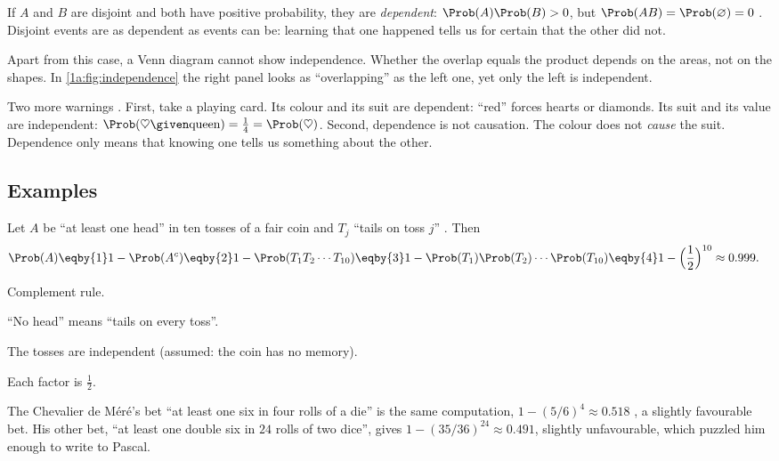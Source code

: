 \begin{keyidea}
If $A$ and $B$ are disjoint and both have positive probability, they are
\emph{dependent}: $\Prob(A)\Prob(B)>0$, but $\Prob(AB)=\Prob(\varnothing)=0$
. Disjoint events are as dependent as events can be: learning
that one happened tells us for certain that the other did not.
\end{keyidea}

Apart from this case, a Venn diagram cannot show independence. Whether the
overlap equals the product depends on the areas, not on the shapes. In
\cref{1a:fig:independence} the right panel looks as ``overlapping'' as the left
one, yet only the left is independent.

Two more warnings . First, take a playing card. Its
colour and its suit are dependent: ``red'' forces hearts or diamonds. Its suit
and its value are independent: $\Prob(\heartsuit\given\text{queen})=\tfrac14=\Prob(\heartsuit)$.
Second, dependence is not causation. The colour does not \emph{cause} the suit.
Dependence only means that knowing one tells us something about the other.

\subsection{Examples}

\label{1a:ex:ten-tosses}
Let $A$ be ``at least one head'' in ten tosses of a fair coin and $T_j$ ``tails on
toss $j$'' . Then
\begin{align*}
\Prob(A)&\eqby{1}1-\Prob(A^c)\eqby{2}1-\Prob(T_1T_2\cdots T_{10})
\eqby{3}1-\Prob(T_1)\Prob(T_2)\cdots\Prob(T_{10})\eqby{4}1-\Bigl(\frac12\Bigr)^{10}\approx0.999 .
\end{align*}
\begin{explain}
  \item Complement rule.
  \item ``No head'' means ``tails on every toss''.
  \item The tosses are independent (assumed: the coin has no memory).
  \item Each factor is $\tfrac12$.
\end{explain}
The Chevalier de M\'er\'e's bet ``at least one six in four rolls of a die'' is
the same computation, $1-(5/6)^4\approx0.518$ , a
slightly favourable bet. His other bet, ``at least one double six in $24$ rolls of
two dice'', gives $1-(35/36)^{24}\approx0.491$, slightly unfavourable, which puzzled
him enough to write to Pascal.

